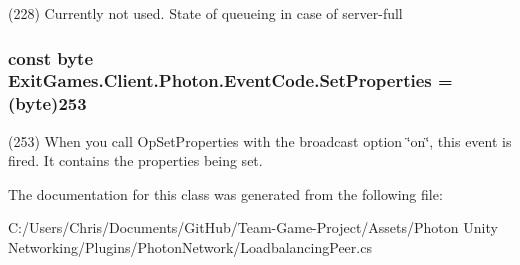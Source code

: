 (228) Currently not used. State of queueing in case of server-\/full

\subsubsection[{\texorpdfstring{Set\+Properties}{SetProperties}}]{\setlength{\rightskip}{0pt plus 5cm}const byte Exit\+Games.\+Client.\+Photon.\+Event\+Code.\+Set\+Properties = (byte)253}\hypertarget{class_exit_games_1_1_client_1_1_photon_1_1_event_code_a922342a5a2475fccf3e2eb887059d7bf}{}\label{class_exit_games_1_1_client_1_1_photon_1_1_event_code_a922342a5a2475fccf3e2eb887059d7bf}


(253) When you call Op\+Set\+Properties with the broadcast option \char`\"{}on\char`\"{}, this event is fired. It contains the properties being set.



The documentation for this class was generated from the following file\+:\begin{DoxyCompactItemize}
\item 
C\+:/\+Users/\+Chris/\+Documents/\+Git\+Hub/\+Team-\/\+Game-\/\+Project/\+Assets/\+Photon Unity Networking/\+Plugins/\+Photon\+Network/Loadbalancing\+Peer.\+cs\end{DoxyCompactItemize}
